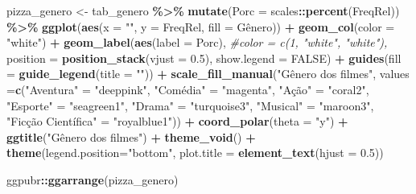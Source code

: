 \documentclass[
]{book}
\newenvironment{Shaded}{\begin{snugshade}}{\end{snugshade}}
\newcommand{\AttributeTok}[1]{\textcolor[rgb]{0.13,0.29,0.53}{#1}}
\newcommand{\CommentTok}[1]{\textcolor[rgb]{0.56,0.35,0.01}{\textit{#1}}}
\newcommand{\ConstantTok}[1]{\textcolor[rgb]{0.56,0.35,0.01}{#1}}
\newcommand{\FloatTok}[1]{\textcolor[rgb]{0.00,0.00,0.81}{#1}}
\newcommand{\FunctionTok}[1]{\textcolor[rgb]{0.13,0.29,0.53}{\textbf{#1}}}
\newcommand{\NormalTok}[1]{#1}
\newcommand{\OtherTok}[1]{\textcolor[rgb]{0.56,0.35,0.01}{#1}}
\newcommand{\SpecialCharTok}[1]{\textcolor[rgb]{0.81,0.36,0.00}{\textbf{#1}}}
\newcommand{\StringTok}[1]{\textcolor[rgb]{0.31,0.60,0.02}{#1}}
\begin{document}
\begin{Shaded}
\begin{Highlighting}[]
\NormalTok{pizza\_genero }\OtherTok{\textless{}{-}}\NormalTok{ tab\_genero }\SpecialCharTok{\%\textgreater{}\%} 
  \FunctionTok{mutate}\NormalTok{(}\AttributeTok{Porc =}\NormalTok{ scales}\SpecialCharTok{::}\FunctionTok{percent}\NormalTok{(FreqRel)) }\SpecialCharTok{\%\textgreater{}\%} 
  \FunctionTok{ggplot}\NormalTok{(}\FunctionTok{aes}\NormalTok{(}\AttributeTok{x =} \StringTok{""}\NormalTok{, }\AttributeTok{y =}\NormalTok{ FreqRel, }\AttributeTok{fill =}\NormalTok{ Gênero)) }\SpecialCharTok{+}
  \FunctionTok{geom\_col}\NormalTok{(}\AttributeTok{color =} \StringTok{"white"}\NormalTok{) }\SpecialCharTok{+} 
  \FunctionTok{geom\_label}\NormalTok{(}\FunctionTok{aes}\NormalTok{(}\AttributeTok{label =}\NormalTok{ Porc), }\CommentTok{\#color = c(1, "white", "white"),}
        \AttributeTok{position =} \FunctionTok{position\_stack}\NormalTok{(}\AttributeTok{vjust =} \FloatTok{0.5}\NormalTok{),}
        \AttributeTok{show.legend =} \ConstantTok{FALSE}\NormalTok{) }\SpecialCharTok{+} \FunctionTok{guides}\NormalTok{(}\AttributeTok{fill =} \FunctionTok{guide\_legend}\NormalTok{(}\AttributeTok{title =} \StringTok{""}\NormalTok{)) }\SpecialCharTok{+}
        \FunctionTok{scale\_fill\_manual}\NormalTok{(}\StringTok{"Gênero dos filmes"}\NormalTok{, }\AttributeTok{values =}\FunctionTok{c}\NormalTok{(}\StringTok{"Aventura"} \OtherTok{=} \StringTok{"deeppink"}\NormalTok{, }
                        \StringTok{"Comédia"} \OtherTok{=} \StringTok{"magenta"}\NormalTok{, }\StringTok{"Ação"} \OtherTok{=} \StringTok{"coral2"}\NormalTok{, }
                        \StringTok{"Esporte"} \OtherTok{=} \StringTok{"seagreen1"}\NormalTok{, }\StringTok{"Drama"} \OtherTok{=} \StringTok{"turquoise3"}\NormalTok{, }
                        \StringTok{"Musical"} \OtherTok{=} \StringTok{"maroon3"}\NormalTok{, }\StringTok{"Ficção Científica"} \OtherTok{=} \StringTok{"royalblue1"}\NormalTok{)) }\SpecialCharTok{+}
  \FunctionTok{coord\_polar}\NormalTok{(}\AttributeTok{theta =} \StringTok{"y"}\NormalTok{) }\SpecialCharTok{+} \FunctionTok{ggtitle}\NormalTok{(}\StringTok{"Gênero dos filmes"}\NormalTok{) }\SpecialCharTok{+}
  \FunctionTok{theme\_void}\NormalTok{() }\SpecialCharTok{+} \FunctionTok{theme}\NormalTok{(}\AttributeTok{legend.position=}\StringTok{"bottom"}\NormalTok{, }
                       \AttributeTok{plot.title =} \FunctionTok{element\_text}\NormalTok{(}\AttributeTok{hjust =} \FloatTok{0.5}\NormalTok{))}

\NormalTok{ggpubr}\SpecialCharTok{::}\FunctionTok{ggarrange}\NormalTok{(pizza\_genero)}
\end{Highlighting}
\end{Shaded}
\end{document}
